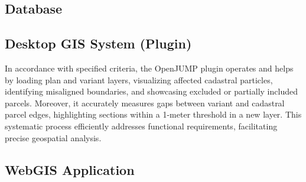 \subsection{Database}\label{subsec:database}

\subsection{Desktop GIS System (Plugin)}\label{subsec:openjump-plugin}
In accordance with specified criteria, the OpenJUMP plugin operates and helps by loading plan and variant layers, visualizing affected cadastral particles, identifying misaligned boundaries, and showcasing excluded or partially included parcels.
Moreover, it accurately measures gaps between variant and cadastral parcel edges, highlighting sections within a 1-meter threshold in a new layer.
This systematic process efficiently addresses functional requirements, facilitating precise geospatial analysis.

\subsection{WebGIS Application}\label{subsec:webgis-application}

